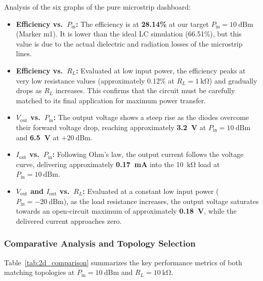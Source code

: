 Analysis of the six graphs of the pure microstrip dashboard:
\begin{itemize}
    \item \textbf{Efficiency vs.\ $P_\mathrm{in}$:}
    The efficiency is at \textbf{28.14\%} at our target
    $P_\mathrm{in} = \SI{10}{\text{dBm}}$ (Marker m1).
    It is lower than the ideal LC simulation (66.51\%), but this value
    is due to the actual dielectric and radiation losses
    of the microstrip lines.

    \item \textbf{Efficiency vs.\ $R_L$:}
    Evaluated at low input power, the efficiency peaks at very low
    resistance values (approximately 0.12\% at
    $R_L = \SI{1}{\kilo\ohm}$) and gradually drops as $R_L$ increases.
    This confirms that the circuit must be carefully matched to its
    final application for maximum power transfer.

    \item \textbf{$V_\mathrm{out}$ vs.\ $P_\mathrm{in}$:}
    The output voltage shows a steep rise as the diodes
    overcome their forward voltage drop, reaching approximately
    \textbf{\SI{3.2}{\volt}} at $P_\mathrm{in} = \SI{10}{\text{dBm}}$
    and \textbf{\SI{6.5}{\volt}} at $+\SI{20}{\text{dBm}}$.

    \item \textbf{$I_\mathrm{out}$ vs.\ $P_\mathrm{in}$:}
    Following Ohm's law, the output current follows the voltage curve,
    delivering approximately \textbf{\SI{0.17}{\milli\ampere}} into the
    \SI{10}{\kilo\ohm} load at $P_\mathrm{in} = \SI{10}{\text{dBm}}$.

    \item \textbf{$V_\mathrm{out}$ and $I_\mathrm{out}$ vs.\ $R_L$:}
    Evaluated at a constant low input power
    ($P_\mathrm{in} = -\SI{20}{\text{dBm}}$), as the load resistance
    increases, the output voltage saturates towards an open-circuit
    maximum of approximately \textbf{\SI{0.18}{\volt}}, while the
    delivered current approaches zero.
\end{itemize}

\subsubsection{Comparative Analysis and Topology Selection}

Table~\ref{tab:2d_comparison} summarizes the key performance metrics
of both matching topologies at $P_\mathrm{in} = \SI{10}{\text{dBm}}$
and $R_L = \SI{10}{\kilo\ohm}$.

